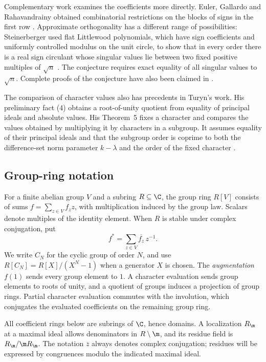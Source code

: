 Complementary work examines the coefficients more directly. Euler,
Gallardo and Rahavandrainy obtained combinatorial restrictions on
the blocks of signs in the first row
\cite{EulerGallardoRahavandrainy2016}. Approximate orthogonality has
a different range of possibilities: Steinerberger used flat Littlewood
polynomials, which have sign coefficients and uniformly controlled
modulus on the unit circle, to show that in every order there is a
real sign circulant whose singular values lie between two fixed positive
multiples of \(\sqrt n\) \cite{Steinerberger2024}. The conjecture
requires exact equality of all singular values to \(\sqrt n\).
Complete proofs of the conjecture have also been claimed in
\cite{OhHashi2016,OrozcoLopez2019,Morris2023,Gallardo2024,ManjhiKumar2025}.

The comparison of character values also has precedents in Turyn's
work. His preliminary fact (4) obtains a root-of-unity quotient from
equality of principal ideals and absolute values. His Theorem~5 fixes
a character and compares the values obtained by multiplying it by
characters in a subgroup. It assumes equality of their principal ideals
and that the subgroup order is coprime to both the difference-set norm parameter \(k-\lambda\)
and the order of the fixed character
\cite[p.~321, item~(4), and Theorem~5, pp.~328--329]{Turyn1965}.

\subsection*{Group-ring notation}

For a finite abelian group \(V\) and a subring \(R\subseteq\C\), the
group ring \(R[V]\) consists of sums \(f=\sum_{z\in V}f_z z\), with
multiplication induced by the group law. Scalars denote multiples of
the identity element. When \(R\) is stable under complex conjugation,
put
\[
 f^*=\sum_{z\in V}\overline{f_z}\,z^{-1}.
\]
We write \(C_N\) for the cyclic group of order \(N\), and use
\(R[C_N]=R[X]/(X^N-1)\) when a generator \(X\) is chosen.
The \emph{augmentation} \(f(1)\) sends every group element to \(1\).
A character evaluation sends group elements to roots of unity, and a
quotient of groups induces a projection of group rings. Partial
character evaluation commutes with the involution, which conjugates
the evaluated coefficients on the remaining group ring.

All coefficient rings below are subrings of \(\C\), hence domains.
A localization \(R_{\m}\) at a maximal ideal allows denominators in
\(R\setminus\m\), and its residue field is
\(R_{\m}/\m R_{\m}\). The notation \(\overline z\) always denotes
complex conjugation; residues will be expressed by congruences modulo
the indicated maximal ideal.

